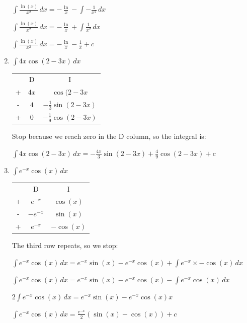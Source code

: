 \documentclass[../main.tex]{subfiles}
\begin{document}
\begin{enumerate}
    \(\int \frac{\ln{(x)}}{x^2}\, dx=-\frac{\ln}{x}-\int -\frac{1}{x^2}\, dx\)
    
    \(\int \frac{\ln{(x)}}{x^2}\, dx=-\frac{\ln}{x}+\int \frac{1}{x^2}\, dx\)

    \(\int \frac{\ln{(x)}}{x^2}\, dx=-\frac{\ln}{x}-\frac{1}{x}+c\)

    \item \(\int 4x\cos{(2-3x)}\, dx\)
    
    \begin{tabular}{ c c c }
       & D & I \\ 
     +  & $4x$     &$\cos{(2-3x}$ \\  
     - & $4$   & $-\frac{1}{3}\sin{(2-3x)}$\\ 
     + & $0$   & $-\frac{1}{9}\cos{(2-3x)}$\\
    \end{tabular}

    Stop because we reach zero in the D column, so the integral is:

    \(\int 4x\cos{(2-3x)}\, dx=-\frac{4x}{3}\sin{(2-3x)}+\frac{4}{9}\cos{(2-3x)}+c\)

    \item \(\int e^{-x}\cos{(x)}\, dx\)
    
    \begin{tabular}{ c c c }
       & D & I \\ 
     +  & $e^{-x}$     &$\cos{(x)}$ \\  
     - & $-e^{-x}$   & $\sin{(x)}$\\ 
     + & $e^{-x}$   & $-\cos{(x)}$\\
    \end{tabular}

    The third row repeats, so we stop:

    \(\int e^{-x}\cos{(x)}\, dx=e^{-x}\sin{(x)}-e^{-x}\cos{(x)}+\int e^{-x}\times -\cos{(x)}\, dx\)

    \(\int e^{-x}\cos{(x)}\, dx=e^{-x}\sin{(x)}-e^{-x}\cos{(x)}-\int e^{-x}\cos{(x)}\, dx\)

    \(2\int e^{-x}\cos{(x)}\, dx=e^{-x}\sin{(x)}-e^{-x}\cos{(x)}x\)

    \(\int e^{-x}\cos{(x)}\, dx=\frac{e^{-x}}{2}(\sin{(x)}-\cos{(x)})+c\)
      
\end{enumerate}
\end{document}
